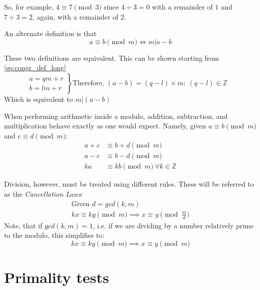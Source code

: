 \documentclass[12pt, titlepage]{article}
\begin{document}
    So, for example, $4 \equiv 7 \pmod{3}$ since $4 \div 3 = 0$ with a remainder of $1$ and
    $7 \div 3 = 2$, again, with a remainder of $2$.

    An alternate definition is that
    \begin{equation*}
        a \equiv b \pmod{m} \iff m | a-b
    \end{equation*}

    These two definitions are equivalent. This can be shown starting from
    \eqref{eq:congr_def_long}
%
    \begin{equation*}
        \left. 
            \begin{aligned}
                a = qm + r\\ 
                b = lm + r
            \end{aligned}
        \right\}
        \text{Therefore, }
        (a - b) = (q-l)\times m :\: (q-l) \in \mathbb{Z}\quad
    \end{equation*}
    Which is equivalent to $m | (a-b)$

    When performing arithmetic inside a modulo, addition, subtraction, and multiplication
    behave exactly as one would expect. Namely, given
    $a\equiv b\pmod{m}$ and $c\equiv d\pmod{m}$:
    \begin{align*}
        a + c &\equiv b + d \pmod{m}\\
        a - c &\equiv b - d \pmod{m}\\
        ka 	  &\equiv kb \pmod{m}\ \forall k \in \mathbb{Z} 
    \end{align*}

    Division, however, must be treated using different rules. These will be referred to as
    the \emph{Cancellation Laws}\autocite[280]{haese_ib_options}:
    \begin{gather*}
        \text{Given } d = gcd(k, m)\\
        kx \equiv ky \pmod{m} \implies x \equiv y \pmod{\frac{m}{d}}
    \end{gather*}
    Note, that if $gcd(k, m) = 1$, i.e. if we are dividing by a number relatively prime to
    the modulo, this simplifies to:
    \begin{equation*}
        kx \equiv ky \pmod{m} \implies x \equiv y \pmod{m}
    \end{equation*}


\section{Primality tests}
\end{document}
